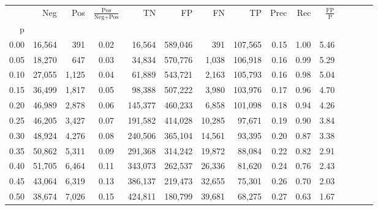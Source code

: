 \begin{tabular}{rrrcrrrrrrrrrrr}
\toprule
{} &     Neg &    Pos & $\frac{\text{Pos}}{\text{Neg}+\text{Pos}}$ &       TN &       FP &       FN &       TP &  Prec &   Rec & $\frac{\text{FP}}{\text{P}}$ \\
p    &         &        &                                            &          &          &          &          &       &       &                              \\
\midrule
0.00 &  16,564 &    391 &                                       0.02 &   16,564 &  589,046 &      391 &  107,565 &  0.15 &  1.00 &                         5.46 \\
0.05 &  18,270 &    647 &                                       0.03 &   34,834 &  570,776 &    1,038 &  106,918 &  0.16 &  0.99 &                         5.29 \\
0.10 &  27,055 &  1,125 &                                       0.04 &   61,889 &  543,721 &    2,163 &  105,793 &  0.16 &  0.98 &                         5.04 \\
0.15 &  36,499 &  1,817 &                                       0.05 &   98,388 &  507,222 &    3,980 &  103,976 &  0.17 &  0.96 &                         4.70 \\
0.20 &  46,989 &  2,878 &                                       0.06 &  145,377 &  460,233 &    6,858 &  101,098 &  0.18 &  0.94 &                         4.26 \\
0.25 &  46,205 &  3,427 &                                       0.07 &  191,582 &  414,028 &   10,285 &   97,671 &  0.19 &  0.90 &                         3.84 \\
0.30 &  48,924 &  4,276 &                                       0.08 &  240,506 &  365,104 &   14,561 &   93,395 &  0.20 &  0.87 &                         3.38 \\
0.35 &  50,862 &  5,311 &                                       0.09 &  291,368 &  314,242 &   19,872 &   88,084 &  0.22 &  0.82 &                         2.91 \\
0.40 &  51,705 &  6,464 &                                       0.11 &  343,073 &  262,537 &   26,336 &   81,620 &  0.24 &  0.76 &                         2.43 \\
0.45 &  43,064 &  6,319 &                                       0.13 &  386,137 &  219,473 &   32,655 &   75,301 &  0.26 &  0.70 &                         2.03 \\
0.50 &  38,674 &  7,026 &                                       0.15 &  424,811 &  180,799 &   39,681 &   68,275 &  0.27 &  0.63 &                         1.67 \\

\end{tabular}
